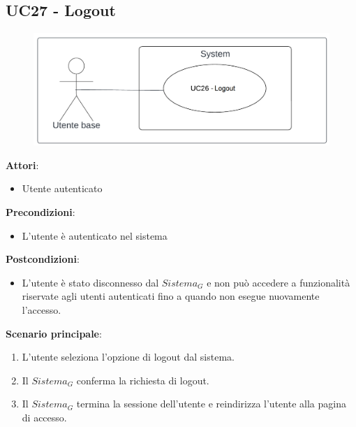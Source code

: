 \subsection{UC27 - Logout}\label{usecase:27}
\begin{figure}[H]
\centering
\includegraphics[width=0.75\linewidth]{ucd/UCD27.png}
\end{figure}
\textbf{Attori}:
\begin{itemize}
    \item Utente autenticato
\end{itemize}
\textbf{Precondizioni}:
\begin{itemize}
    \item L'utente è autenticato nel sistema
\end{itemize}
\textbf{Postcondizioni}:
\begin{itemize}
    \item L'utente è stato disconnesso dal $\textit{Sistema}_G$ e non può accedere a funzionalità riservate agli utenti autenticati fino a quando non esegue nuovamente l'accesso.
\end{itemize}
\textbf{Scenario principale}:
\begin{enumerate}
    \item L'utente seleziona l'opzione di logout dal sistema.
    \item Il $\textit{Sistema}_G$ conferma la richiesta di logout.
    \item Il $\textit{Sistema}_G$ termina la sessione dell'utente e reindirizza l'utente alla pagina di accesso.
\end{enumerate}

\newpage